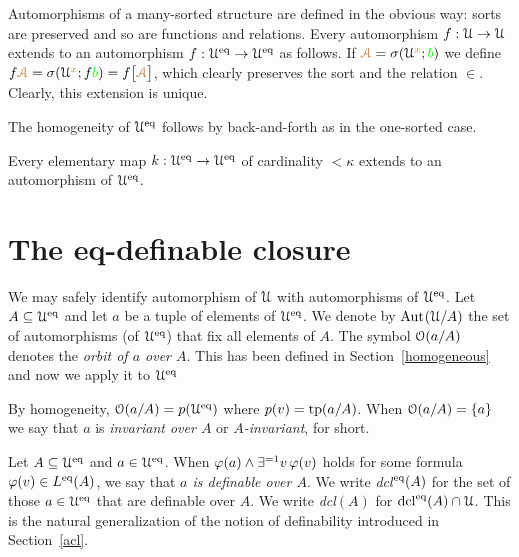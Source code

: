 Automorphisms of a many-sorted structure are defined in the obvious way: sorts are preserved and so are functions and relations.
Every automorphism $f:\EuScript U\rightarrow\EuScript U$ extends to an automorphism $f:\EuScript U^{{\rm eq}}\rightarrow\EuScript U^{{\rm eq}}$ as follows.
If ${\color{brown}\EuScript A}=\sigma(\EuScript U^{\color{brown} x};{\color{green} b})$ we define $f{\color{brown}\EuScript A}=\sigma(\EuScript U^{\color{brown} x};f{\color{green} b})=f\big[{\color{brown}\EuScript A}\big]$, which clearly preserves the sort and the relation $\in$.
Clearly, this extension is unique.

The homogeneity of $\EuScript U^{{\rm eq}}$ follows by back-and-forth as in the one-sorted case.

\begin{proposition}\label{prop_Ueq_homogeneous}
Every elementary map $k:\EuScript U^{{\rm eq}}\to\EuScript U^{{\rm eq}}$ of cardinality $<\kappa$ extends to an automorphism of $\EuScript U^{{\rm eq}}$.
\end{proposition} 

\section{The eq-definable closure}
We may safely identify automorphism of $\EuScript U$ with automorphisms of $\EuScript U^{{\rm eq}}$.
Let $A\subseteq\EuScript U^{{\rm eq}}$ and let $a$ be a tuple of elements of $\EuScript U^{{{\rm eq}}}$.
We denote by \emph{${\rm Aut\kern.15ex}(\EuScript U/A)$\/} the set of automorphisms (of $\EuScript U^{{\rm eq}}$) that fix all elements of $A$.
The symbol \emph{$\EuScript O(a/A)$\/} denotes the \emph{orbit of $a$ over $A$}.
This has been defined in Section~\ref{homogeneous} and now we apply it to $\EuScript U^{{\rm eq}}$


By homogeneity, $\EuScript O(a/A)=p(\EuScript U^{{\rm eq}})$ where $p(v)={\rm tp}(a/A)$.
When $\EuScript O(a/A)=\{a\}$ we say that $a$ is \emph{invariant over $A$\/} or \emph{$A$-invariant}, for short.


\begin{definition}\label{def_def}
Let $A\subseteq\EuScript U^{{\rm eq}}$ and $a\in\EuScript U^{{\rm eq}}$.
When $\varphi(a)\wedge\exists^{=1}v\,\varphi(v)$ holds for some formula $\varphi(v)\in L^{{\rm eq}}(A)$, we say that \emph{$a$ is definable over $A$}.
We write \emph{\rm dcl$^{\rm eq}(A)$\/} for the set of those $a\in\EuScript U^{{\rm eq}}$ that are definable over $A$.
We write \emph{\rm dcl$(A)$\/} for ${\rm dcl}^{{\rm eq}}(A)\cap\EuScript U$.
This is the natural generalization of the notion of definability introduced in Section~\ref{acl}.
\end{definition}

